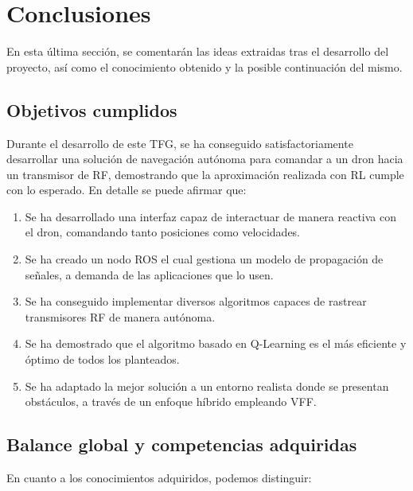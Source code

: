 \chapter{Conclusiones}
\label{cap:capitulo5}

En esta última sección, se comentarán las ideas extraidas tras el desarrollo del proyecto, así como el conocimiento obtenido y la posible continuación del mismo.

\section{Objetivos cumplidos}
\label{sec:objetivos_cumplidos}

Durante el desarrollo de este \ac{TFG}, se ha conseguido satisfactoriamente desarrollar una solución de navegación autónoma para comandar a un dron hacia un transmisor de \ac{RF}, demostrando que la aproximación realizada con \ac{RL} cumple con lo esperado. En detalle se puede afirmar que:

\begin{enumerate}
    \item Se ha desarrollado una interfaz capaz de interactuar de manera reactiva con el dron, comandando tanto posiciones como velocidades.
    \item Se ha creado un nodo \ac{ROS} el cual gestiona un modelo de propagación de señales, a demanda de las aplicaciones que lo usen.
    \item Se ha conseguido implementar diversos algoritmos capaces de rastrear transmisores \ac{RF} de manera autónoma.
    \item Se ha demostrado que el algoritmo basado en Q-Learning es el más eficiente y óptimo de todos los planteados.
    \item Se ha adaptado la mejor solución a un entorno realista donde se presentan obstáculos, a través de un enfoque híbrido empleando \ac{VFF}.
\end{enumerate}

\section{Balance global y competencias adquiridas}
\label{sec:balance_global_competencias_adquiridas}

En cuanto a los conocimientos adquiridos, podemos distinguir:

